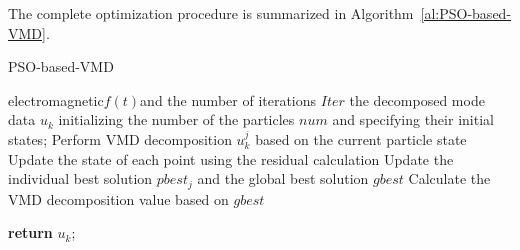 \documentclass[3p,authoryear,preprint,12pt]{elsarticle}
\begin{document}
The complete optimization procedure is summarized in Algorithm~\ref{al:PSO-based-VMD}.
\begin{algorithm}[htb]
	\renewcommand{\algorithmicrequire}{\textbf{input:}}
	\renewcommand{\algorithmicensure}{\textbf{output:}}
	\caption{PSO-based-VMD}
	\label{al:PSO-based-VMD}
	\begin{algorithmic}[1]
	\REQUIRE  electromagnetic$f(t)$and the number of iterations{ }$Iter$  
	\ENSURE the decomposed mode data{ }$u_k$ 	
	\STATE initializing the number of the particles{ }$num$ and specifying their initial states;
			\STATE Perform VMD decomposition $u_k^j$ based on the current particle state
			\STATE Update the state of each point using the residual calculation
			\STATE Update the individual best solution $pbest_j$ and the global best solution $gbest$
		\ENDFOR
	\ENDFOR	
	\STATE Calculate the VMD decomposition value based on $gbest$
		
	\STATE \textbf{return} $u_k$;
	\end{algorithmic}
\end{algorithm}
\end{document}

